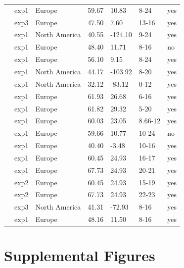 \documentclass{article}
\begin{document}
\begin{footnotesize}
\begin{table}[ht]
\begin{tabular}{|p{}|p{}|p{}|p{}|p{}|p{}|p{}|}
  \citet{Heide:1993a} & exp1 & Europe & 59.67 & 10.83 & 8-24 & yes \\ 
  \citet{Heide:1993a} & exp3 & Europe & 47.50 & 7.60 & 13-16 & yes \\ 
  \citet{Howe:1995aa} & exp1 & North America & 40.55 & -124.10 & 9-24 & yes \\ 
  \citet{Laube:2014a} & exp1 & Europe & 48.40 & 11.71 & 8-16 & no \\ 
  \citet{Myking:1995} & exp1 & Europe & 56.10 & 9.15 & 8-24 & yes \\ 
  \citet{Nienstaedt:1966aa} & exp1 & North America & 44.17 & -103.92 & 8-20 & yes \\ 
  \citet{Okie:2011aa} & exp1 & North America & 32.12 & -83.12 & 0-12 & yes \\ 
  \citet{Partanen:2001aa} & exp1 & Europe & 61.93 & 26.68 & 6-16 & yes \\ 
  \citet{Partanen:2005aa} & exp1 & Europe & 61.82 & 29.32 & 5-20 & yes \\ 
  \citet{Partanen:1998aa} & exp1 & Europe & 60.03 & 23.05 & 8.66-12 & yes \\ 
  \citet{Pettersen:1972aa} & exp1 & Europe & 59.66 & 10.77 & 10-24 & no \\ 
  \citet{Sanz-Perez:2009aa} & exp1 & Europe & 40.40 & -3.48 & 10-16 & yes \\ 
  \citet{Vihera-Aarnio:2006aa} & exp1 & Europe & 60.45 & 24.93 & 16-17 & yes \\ 
  \citet{Vihera-Aarnio:2006aa} & exp1 & Europe & 67.73 & 24.93 & 20-21 & yes \\ 
  \citet{Vihera-Aarnio:2006aa} & exp2 & Europe & 60.45 & 24.93 & 15-19 & yes \\ 
  \citet{Vihera-Aarnio:2006aa} & exp2 & Europe & 67.73 & 24.93 & 22-23 & yes \\ 
  \citet{Worrall:1967aa} & exp3 & North America & 41.31 & -72.93 & 8-16 & yes \\ 
  \citet{zohner2016} & exp1 & Europe & 48.16 & 11.50 & 8-16 & yes \\ 
   \hline
\end{tabular}
\endgroup
\end{table}\end{footnotesize} 
\clearpage
\section* {Supplemental Figures}
\end{document}
